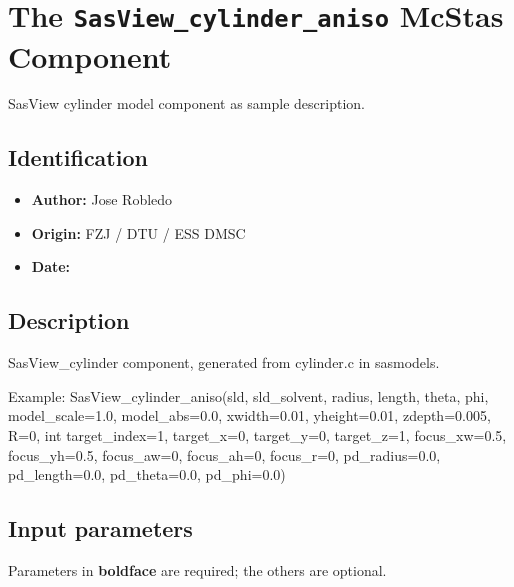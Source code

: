 \section{The \texttt{SasView\_cylinder\_aniso} McStas Component}
SasView cylinder model component as sample description.

\subsection*{Identification}
\begin{itemize}
  \item \textbf{Author:} Jose Robledo
  \item \textbf{Origin:} FZJ / DTU / ESS DMSC
  \item \textbf{Date:} 
\end{itemize}

\subsection*{Description}
SasView\_cylinder component, generated from cylinder.c in sasmodels.

Example: SasView\_cylinder\_aniso(sld, sld\_solvent, radius, length, theta, phi, model\_scale=1.0, model\_abs=0.0, xwidth=0.01, yheight=0.01, zdepth=0.005, R=0, int target\_index=1, target\_x=0, target\_y=0, target\_z=1, focus\_xw=0.5, focus\_yh=0.5, focus\_aw=0, focus\_ah=0, focus\_r=0, pd\_radius=0.0, pd\_length=0.0, pd\_theta=0.0, pd\_phi=0.0)

\subsection*{Input parameters}
Parameters in \textbf{boldface} are required; the others are optional.

